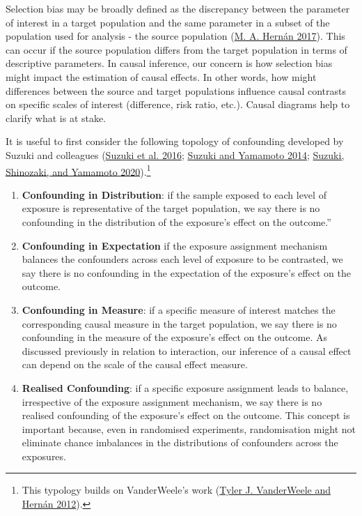 \documentclass[
  singlecolumn]{report}
\begin{document}
Selection bias may be broadly defined as the discrepancy between the
parameter of interest in a target population and the same parameter in a
subset of the population used for analysis - the source population
(\protect\hyperlink{ref-hernuxe1n2017}{M. A. Hernán 2017}). This can
occur if the source population differs from the target population in
terms of descriptive parameters. In causal inference, our concern is how
selection bias might impact the estimation of causal effects. In other
words, how might differences between the source and target populations
influence causal contrasts on specific scales of interest (difference,
risk ratio, etc.). Causal diagrams help to clarify what is at stake.

It is useful to first consider the following topology of confounding
developed by Suzuki and colleagues
(\protect\hyperlink{ref-suzuki2016}{Suzuki et al. 2016};
\protect\hyperlink{ref-suzuki2014}{Suzuki and Yamamoto 2014};
\protect\hyperlink{ref-suzuki2020}{Suzuki, Shinozaki, and Yamamoto
2020}).\footnote{This typology builds on VanderWeele's work
  (\protect\hyperlink{ref-vanderweele2012}{Tyler J. VanderWeele and
  Hernán 2012}).}

\begin{enumerate}
\def\labelenumi{\arabic{enumi}.}
\item
  \textbf{Confounding in Distribution}: if the sample exposed to each
  level of exposure is representative of the target population, we say
  there is no confounding in the distribution of the exposure's effect
  on the outcome.''
\item
  \textbf{Confounding in Expectation} if the exposure assignment
  mechanism balances the confounders across each level of exposure to be
  contrasted, we say there is no confounding in the expectation of the
  exposure's effect on the outcome.
\item
  \textbf{Confounding in Measure}: if a specific measure of interest
  matches the corresponding causal measure in the target population, we
  say there is no confounding in the measure of the exposure's effect on
  the outcome. As discussed previously in relation to interaction, our
  inference of a causal effect can depend on the scale of the causal
  effect measure.
\item
  \textbf{Realised Confounding}: if a specific exposure assignment leads
  to balance, irrespective of the exposure assignment mechanism, we say
  there is no realised confounding of the exposure's effect on the
  outcome. This concept is important because, even in randomised
  experiments, randomisation might not eliminate chance imbalances in
  the distributions of confounders across the exposures.
\end{enumerate}
\end{document}
